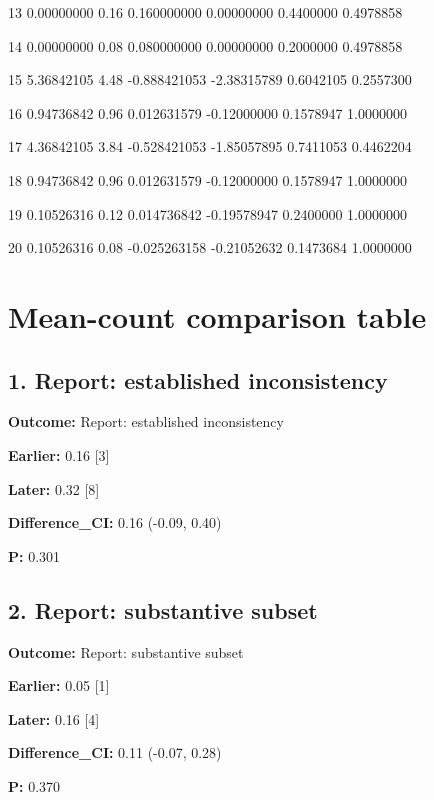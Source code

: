 \documentclass[10pt,a4paper]{article}
\begin{document}
13 0.\allowbreak{}00000000      0.\allowbreak{}16  0.\allowbreak{}160000000  0.\allowbreak{}00000000 0.\allowbreak{}4400000 0.\allowbreak{}4978858\par
14 0.\allowbreak{}00000000      0.\allowbreak{}08  0.\allowbreak{}080000000  0.\allowbreak{}00000000 0.\allowbreak{}2000000 0.\allowbreak{}4978858\par
15 5.\allowbreak{}36842105      4.\allowbreak{}48 -\allowbreak{}0.\allowbreak{}888421053 -\allowbreak{}2.\allowbreak{}38315789 0.\allowbreak{}6042105 0.\allowbreak{}2557300\par
16 0.\allowbreak{}94736842      0.\allowbreak{}96  0.\allowbreak{}012631579 -\allowbreak{}0.\allowbreak{}12000000 0.\allowbreak{}1578947 1.\allowbreak{}0000000\par
17 4.\allowbreak{}36842105      3.\allowbreak{}84 -\allowbreak{}0.\allowbreak{}528421053 -\allowbreak{}1.\allowbreak{}85057895 0.\allowbreak{}7411053 0.\allowbreak{}4462204\par
18 0.\allowbreak{}94736842      0.\allowbreak{}96  0.\allowbreak{}012631579 -\allowbreak{}0.\allowbreak{}12000000 0.\allowbreak{}1578947 1.\allowbreak{}0000000\par
19 0.\allowbreak{}10526316      0.\allowbreak{}12  0.\allowbreak{}014736842 -\allowbreak{}0.\allowbreak{}19578947 0.\allowbreak{}2400000 1.\allowbreak{}0000000\par
20 0.\allowbreak{}10526316      0.\allowbreak{}08 -\allowbreak{}0.\allowbreak{}025263158 -\allowbreak{}0.\allowbreak{}21052632 0.\allowbreak{}1473684 1.\allowbreak{}0000000\par
\clearpage\section{Mean-\allowbreak{}count comparison table}
\subsection*{1.\allowbreak{} Report: established inconsistency}
\textbf{Outcome:} Report: established inconsistency\par
\textbf{Earlier:} 0.\allowbreak{}16 [3]\par
\textbf{Later:} 0.\allowbreak{}32 [8]\par
\textbf{Difference\_\allowbreak{}CI:} 0.\allowbreak{}16 (-\allowbreak{}0.\allowbreak{}09, 0.\allowbreak{}40)\par
\textbf{P:} 0.\allowbreak{}301\par
\subsection*{2.\allowbreak{} Report: substantive subset}
\textbf{Outcome:} Report: substantive subset\par
\textbf{Earlier:} 0.\allowbreak{}05 [1]\par
\textbf{Later:} 0.\allowbreak{}16 [4]\par
\textbf{Difference\_\allowbreak{}CI:} 0.\allowbreak{}11 (-\allowbreak{}0.\allowbreak{}07, 0.\allowbreak{}28)\par
\textbf{P:} 0.\allowbreak{}370\par
\end{document}
